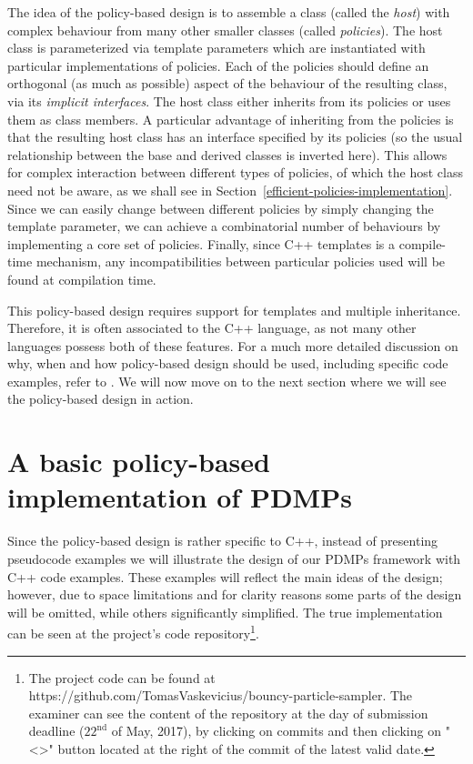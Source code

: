 \documentclass[report.tex]{subfiles}
\begin{document}
The idea of the policy-based design is to assemble a class (called the \textit{host})
with complex behaviour from many other smaller classes (called \textit{policies}).
The host class is parameterized via template parameters which are instantiated
with particular implementations of policies.
Each of the policies should define an orthogonal (as much as possible) aspect of the
behaviour of the resulting class, via its \textit{implicit interfaces}.
The host class either inherits from its policies or uses them as class members.
A particular advantage of inheriting from the policies is that the resulting
host class has an interface specified by its policies (so the usual relationship
between the base and derived classes is inverted here). This allows for complex
interaction between different types of policies, of which the host class need not
be aware, as we shall see in
Section~\ref{efficient-policies-implementation}.
Since we can easily change between different policies by simply changing the template
parameter, we can achieve a combinatorial number of behaviours by
implementing a core set of policies.
Finally, since C++ templates is a compile-time mechanism, any incompatibilities
between particular policies used will be found at compilation time.

This policy-based design requires support for templates and multiple inheritance.
Therefore, it is often associated to the C++ language, as not many other languages
possess both of these features.
For a much more detailed discussion on why, when and how
policy-based design should be used, including specific code examples, refer to \cite{alexandrescu2001modern}.
We will now move on to the next section where we will see the policy-based design in action.

\section{A basic policy-based implementation of PDMPs}

Since the policy-based design is rather specific to C++, instead of presenting pseudocode
examples we will illustrate the design  of our PDMPs framework with C++ code examples.
These examples will reflect the main ideas of the design; however, due to space
limitations and for clarity reasons some parts of the design will be omitted,
while others significantly simplified. The true implementation can be seen at
the project's code repository\footnote{
The project code can be found at https://github.com/TomasVaskevicius/bouncy-particle-sampler.
The examiner can see the content of the repository at the day of submission deadline
($22^{\text{nd}}$ of May, 2017), by clicking on commits and then clicking on "<>" button
located at the right of the commit of the latest valid date.
}.
\end{document}
